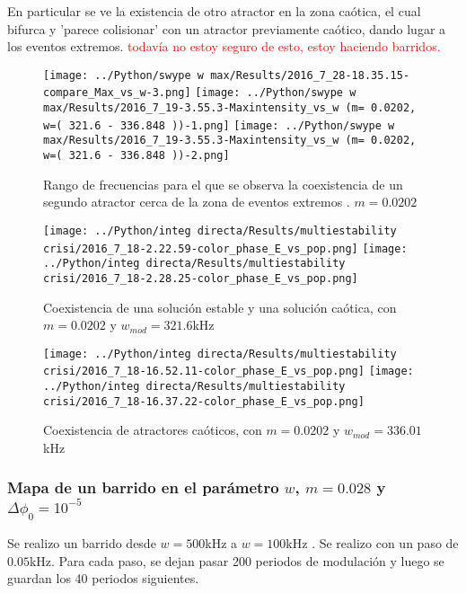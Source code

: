 	En particular se ve la existencia de otro atractor en la zona caótica, el cual bifurca y 'parece colisionar' con un atractor previamente caótico, dando lugar a los eventos extremos.
	\textcolor{red}{ todavía no estoy seguro de esto, estoy haciendo barridos.}
	
	
	\begin{figure}[htp]
		\begin{center}
			\texttt{[image: ../Python/swype w max/Results/2016\_7\_28-18.35.15-compare\_Max\_vs\_w-3.png]}
			\texttt{[image: ../Python/swype w max/Results/2016\_7\_19-3.55.3-Maxintensity\_vs\_w (m= 0.0202, w=( 321.6 - 336.848 ))-1.png]}
			\texttt{[image: ../Python/swype w max/Results/2016\_7\_19-3.55.3-Maxintensity\_vs\_w (m= 0.0202, w=( 321.6 - 336.848 ))-2.png]}
		\end{center}
		\caption{Rango de frecuencias para el que se observa la coexistencia de un segundo atractor  cerca de la zona de eventos extremos . $m=0.0202$ }
		\label{rango coex m 202}
	\end{figure}		
	
	\begin{figure}[htp]
		\texttt{[image: ../Python/integ directa/Results/multiestability crisi/2016\_7\_18-2.22.59-color\_phase\_E\_vs\_pop.png]}
		\texttt{[image: ../Python/integ directa/Results/multiestability crisi/2016\_7\_18-2.28.25-color\_phase\_E\_vs\_pop.png]}
		\caption{Coexistencia de una solución estable y una solución caótica, con $m=0.0202$ y $w_{mod}=321.6$kHz}
	\end{figure}
	
	
	\begin{figure}[htp]
		\texttt{[image: ../Python/integ directa/Results/multiestability crisi/2016\_7\_18-16.52.11-color\_phase\_E\_vs\_pop.png]}
		\texttt{[image: ../Python/integ directa/Results/multiestability crisi/2016\_7\_18-16.37.22-color\_phase\_E\_vs\_pop.png]}
		\caption{Coexistencia de atractores caóticos, con $m=0.0202$ y $w_{mod}=336.01$kHz}
	\end{figure}
			
		\subsubsection{Mapa de un barrido en el parámetro $w$, $m=0.028$ y $\Delta \phi_0=10^{-5}$}			 
		
		Se realizo un barrido desde $w=500$kHz a $w=100$kHz . Se realizo con un paso de $0.05$kHz. Para cada paso, se dejan pasar 200 periodos de modulación y luego se guardan los 40 periodos siguientes.
		 
